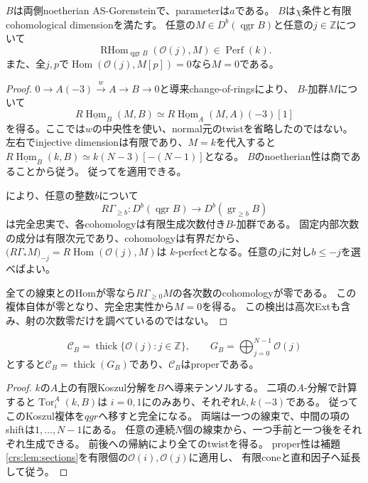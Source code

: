 \begin{lemma}
\label{crs:lem:sections}
$B$は両側noetherian AS-Gorensteinで、parameterは$a$である。
$B$は$\chi$条件と有限cohomological dimensionを満たす。
任意の$M\in D^b(\operatorname{qgr}B)$と任意の$j\in\mathbb Z$について
\[
 \operatorname{RHom}_{\operatorname{qgr}B}(\mathcal O(j),M)
 \in\operatorname{Perf}(k).
 \tag{CS1}\label{crs:eq:finite-Hom}
\]
また、全$j,p$で$\operatorname{Hom}(\mathcal O(j),M[p])=0$なら$M=0$である。
\end{lemma}
\begin{proof}
$0\to A(-3)\xrightarrow{w}A\to B\to0$と導来change-of-ringsにより、
$B$-加群$M$について
\[
 R\underline{\operatorname{Hom}}_B(M,B)
 \simeq R\underline{\operatorname{Hom}}_A(M,A)(-3)[1]
\]
を得る。ここでは$w$の中央性を使い、normal元のtwistを省略したのではない。
左右でinjective dimensionは有限であり、$M=k$を代入すると
$R\underline{\operatorname{Hom}}_B(k,B)\simeq k(N-3)[-(N-1)]$となる。
$B$のnoetherian性は商であることから従う。
従って\cite[Lemmas~6.1--6.2]{LP-BS}を適用できる。

\cite[Proposition~4.18とその直前の導来随伴]{LP-BS}により、任意の整数$b$について
\[
 R\Gamma_{\ge b}:D^b(\operatorname{qgr}B)
 \longrightarrow D^b(\operatorname{gr}_{\ge b}B)
 \tag{CS2}\label{crs:eq:sections}
\]
は完全忠実で、各cohomologyは有限生成次数付き$B$-加群である。
固定内部次数の成分は有限次元であり、cohomologyは有界だから、
$\bigl(R\Gamma_*M\bigr)_{-j}=R\operatorname{Hom}(\mathcal O(j),M)$は
$k$-perfectとなる。任意の$j$に対し$b\le-j$を選べばよい。

全ての線束とのHomが零なら$R\Gamma_{\ge0}M$の各次数のcohomologyが零である。
この複体自体が零となり、完全忠実性から$M=0$を得る。
この検出は高次Extも含み、射の次数零だけを調べているのではない。
\end{proof}

\begin{lemma}[有限線束生成対象]
\label{crs:lem:finite-lines}
\[
 \mathcal C_B=\operatorname{thick}\{\mathcal O(j):j\in\mathbb Z\},
 \qquad G_B=\bigoplus_{j=0}^{N-1}\mathcal O(j)
\]
とすると$\mathcal C_B=\operatorname{thick}(G_B)$であり、$\mathcal C_B$はproperである。
\end{lemma}
\begin{proof}
$k$の$A$上の有限Koszul分解を$B$へ導来テンソルする。
二項の$A$-分解で計算すると$\operatorname{Tor}^A_i(k,B)$は
$i=0,1$にのみあり、それぞれ$k,k(-3)$である。
従ってこのKoszul複体を$qgr$へ移すと完全になる。
両端は一つの線束で、中間の項のshiftは$1,\ldots,N-1$にある。
任意の連続$N$個の線束から、一つ手前と一つ後をそれぞれ生成できる。
前後への帰納により全てのtwistを得る。
proper性は補題\ref{crs:lem:sections}を有限個の$\mathcal O(i),\mathcal O(j)$に適用し、
有限coneと直和因子へ延長して従う。
\end{proof}

